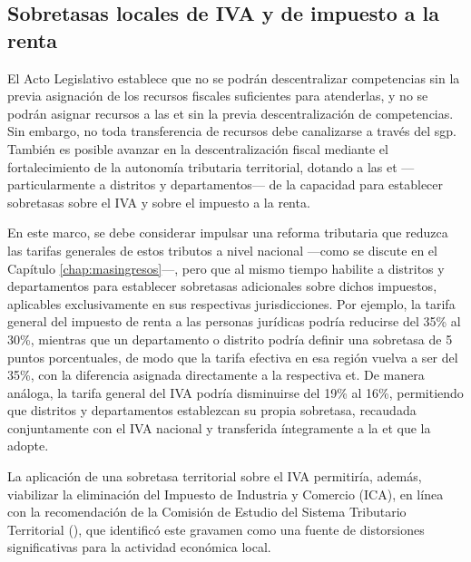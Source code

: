 \subsection{Sobretasas locales de IVA y de impuesto a la renta}

El Acto Legislativo establece que no se podrán descentralizar competencias sin la previa asignación de los recursos fiscales suficientes para atenderlas, y no se podrán asignar recursos a las \gls{et} sin la previa descentralización de competencias. Sin embargo, no toda transferencia de recursos debe canalizarse a través del \gls{sgp}. También es posible avanzar en la descentralización fiscal mediante el fortalecimiento de la autonomía tributaria territorial, dotando a las \gls{et} —particularmente a distritos y departamentos— de la capacidad para establecer sobretasas sobre el IVA y sobre el impuesto a la renta.

En este marco, se debe considerar impulsar una reforma tributaria que reduzca las tarifas generales de estos tributos a nivel nacional —como se discute en el Capítulo \ref{chap:masingresos}—, pero que al mismo tiempo habilite a distritos y departamentos para establecer sobretasas adicionales sobre dichos impuestos, aplicables exclusivamente en sus respectivas jurisdicciones. Por ejemplo, la tarifa general del impuesto de renta a las personas jurídicas podría reducirse del 35\% al 30\%, mientras que un departamento o distrito podría definir una sobretasa de 5 puntos porcentuales, de modo que la tarifa efectiva en esa región vuelva a ser del 35\%, con la diferencia asignada directamente a la respectiva \gls{et}. De manera análoga, la tarifa general del IVA podría disminuirse del 19\% al 16\%, permitiendo que distritos y departamentos establezcan su propia sobretasa, recaudada conjuntamente con el IVA nacional y transferida íntegramente a la \gls{et} que la adopte.

La aplicación de una sobretasa territorial sobre el IVA permitiría, además, viabilizar la eliminación del Impuesto de Industria y Comercio (ICA), en línea con la recomendación de la Comisión de Estudio del Sistema Tributario Territorial (\cite{CEDE2020}), que identificó este gravamen como una fuente de distorsiones significativas para la actividad económica local.

